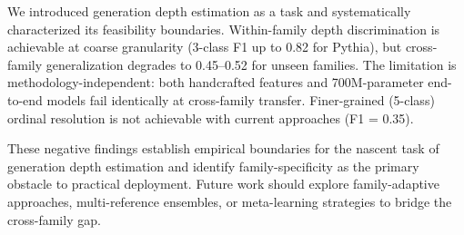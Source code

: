 \documentclass[11pt,a4paper]{article}
\begin{document}
We introduced generation depth estimation as a task and systematically characterized its feasibility boundaries.
Within-family depth discrimination is achievable at coarse granularity (3-class F1 up to 0.82 for Pythia), but cross-family generalization degrades to 0.45--0.52 for unseen families.
The limitation is methodology-independent: both handcrafted features and 700M-parameter end-to-end models fail identically at cross-family transfer.
Finer-grained (5-class) ordinal resolution is not achievable with current approaches (F1 = 0.35).

These negative findings establish empirical boundaries for the nascent task of generation depth estimation and identify family-specificity as the primary obstacle to practical deployment.
Future work should explore family-adaptive approaches, multi-reference ensembles, or meta-learning strategies to bridge the cross-family gap.
\end{document}
